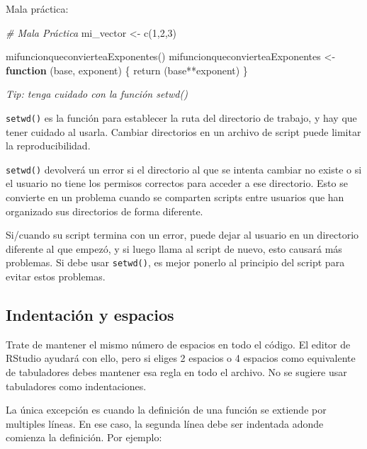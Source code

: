 \documentclass[
]{book}
\newenvironment{Shaded}{\begin{snugshade}}{\end{snugshade}}
\newcommand{\CommentTok}[1]{\textcolor[rgb]{0.56,0.35,0.01}{\textit{#1}}}
\newcommand{\ControlFlowTok}[1]{\textcolor[rgb]{0.13,0.29,0.53}{\textbf{#1}}}
\newcommand{\DecValTok}[1]{\textcolor[rgb]{0.00,0.00,0.81}{#1}}
\newcommand{\FunctionTok}[1]{\textcolor[rgb]{0.00,0.00,0.00}{#1}}
\newcommand{\NormalTok}[1]{#1}
\newcommand{\OtherTok}[1]{\textcolor[rgb]{0.56,0.35,0.01}{#1}}
\newcommand{\SpecialCharTok}[1]{\textcolor[rgb]{0.00,0.00,0.00}{#1}}
\begin{document}
Mala práctica:

\begin{Shaded}
\begin{Highlighting}[]
\CommentTok{\# Mala Práctica}
\NormalTok{mi\_vector }\OtherTok{\textless{}{-}} \FunctionTok{c}\NormalTok{(}\DecValTok{1}\NormalTok{,}\DecValTok{2}\NormalTok{,}\DecValTok{3}\NormalTok{)}

\FunctionTok{mifuncionqueconvierteaExponentes}\NormalTok{() }
\NormalTok{mifuncionqueconvierteaExponentes }\OtherTok{\textless{}{-}} \ControlFlowTok{function}\NormalTok{ (base, exponent) \{}
  \FunctionTok{return}\NormalTok{ (base}\SpecialCharTok{**}\NormalTok{exponent)}
\NormalTok{\}}
\end{Highlighting}
\end{Shaded}

\emph{Tip: tenga cuidado con la función setwd()}

\texttt{setwd()} es la función para establecer la ruta del directorio de trabajo, y hay que tener cuidado al usarla. Cambiar directorios en un archivo de script puede limitar la reproducibilidad.

\texttt{setwd()} devolverá un error si el directorio al que se intenta cambiar no existe o si el usuario no tiene los permisos correctos para acceder a ese directorio. Esto se convierte en un problema cuando se comparten scripts entre usuarios que han organizado sus directorios de forma diferente.

Si/cuando su script termina con un error, puede dejar al usuario en un directorio diferente al que empezó, y si luego llama al script de nuevo, esto causará más problemas. Si debe usar \texttt{setwd()}, es mejor ponerlo al principio del script para evitar estos problemas.

\hypertarget{indentaciuxf3n-y-espacios}{%
\subsection{Indentación y espacios}\label{indentaciuxf3n-y-espacios}}

Trate de mantener el mismo número de espacios en todo el código. El editor de RStudio ayudará con ello, pero si eliges 2 espacios o 4 espacios como equivalente de tabuladores debes mantener esa regla en todo el archivo. No se sugiere usar tabuladores como indentaciones.

La única excepción es cuando la definición de una función se extiende por multiples líneas. En ese caso, la segunda línea debe ser indentada adonde comienza la definición. Por ejemplo:
\end{document}
